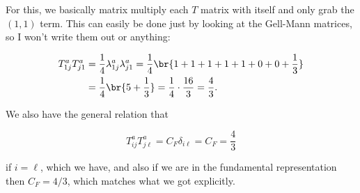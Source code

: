 \section{}

For this, we basically matrix multiply each $T$ matrix with itself and only grab the $(1,1)$ term. This can easily be done just by looking at the Gell-Mann matrices, so I won't write them out or anything:

\begin{align}
  T^a_{1j}T^a_{j1} &= \frac{1}{4}\lambda^a_{1j}\lambda^a_{j1} = \frac{1}{4}\br{1 + 1 + 1 + 1 + 1 + 0 + 0 + \frac{1}{3}} \\
                   &= \frac{1}{4}\br{5 + \frac{1}{3}} = \frac{1}{4} \cdot \frac{16}{3} = \frac{4}{3}.
\end{align}

We also have the general relation that

\begin{equation}
  T^a_{ij}T^a_{j\ell} = C_F \delta_{i\ell} = C_F = \frac{4}{3}
\end{equation}

if $i = \ell$, which we have, and also if we are in the fundamental representation then $C_F = 4/3$, which matches what we got explicitly.

